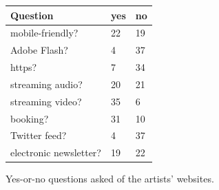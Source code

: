 \documentclass[unicode,hyperfootnotes=false,xetex,colorlinks=true,nofonts,nobib]{tufte-handout}
\begin{document}
\begin{margintable}\centering
  \small
  \begin{tabular}{p{} l l}\toprule
    Question & yes & no \\\midrule
    mobile-friendly? & 22 & 19\\
    Adobe Flash? & 4 & 37\\
    https? & 7 & 34\\
    streaming audio? & 20 & 21\\
    streaming video? & 35 & 6\\
    booking? & 31 & 10\\
    Twitter feed? & 4 & 37\\
    electronic newsletter? & 19 & 22\\
    \bottomrule
  \end{tabular}
  \vspace{6pt}
  \caption{Yes-or-no questions asked of the artists' websites.}
\end{margintable}
\end{document}
